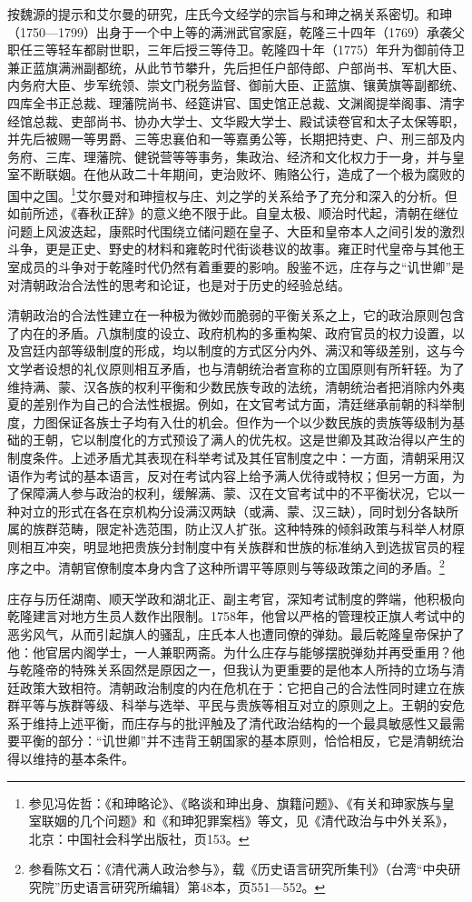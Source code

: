 \documentclass[a4paper, 12pt, openright]{ctexbook}
\begin{document}
按魏源的提示和艾尔曼的研究，庄氏今文经学的宗旨与和珅之祸关系密切。和珅（1750—1799）出身于一个中上等的满洲武官家庭，乾隆三十四年（1769）承袭父职任三等轻车都尉世职，三年后授三等侍卫。乾隆四十年（1775）年升为御前侍卫兼正蓝旗满洲副都统，从此节节攀升，先后担任户部侍郎、户部尚书、军机大臣、内务府大臣、步军统领、崇文门税务监督、御前大臣、正蓝旗、镶黄旗等副都统、四库全书正总裁、理藩院尚书、经筵讲官、国史馆正总裁、文渊阁提举阁事、清字经馆总裁、吏部尚书、协办大学士、文华殿大学士、殿试读卷官和太子太保等职，并先后被赐一等男爵、三等忠襄伯和一等嘉勇公等，长期把持吏、户、刑三部及内务府、三库、理藩院、健锐营等等事务，集政治、经济和文化权力于一身，并与皇室不断联姻。在他从政二十年期间，吏治败坏、贿赂公行，造成了一个极为腐败的国中之国。\footnote{参见冯佐哲：《和珅略论》、《略谈和珅出身、旗籍问题》、《有关和珅家族与皇室联姻的几个问题》和《和珅犯罪案档》等文，见《清代政治与中外关系》，北京：中国社会科学出版社，页153。}艾尔曼对和珅擅权与庄、刘之学的关系给予了充分和深入的分析。但如前所述，《春秋正辞》的意义绝不限于此。自皇太极、顺治时代起，清朝在继位问题上风波迭起，康熙时代围绕立储问题在皇子、大臣和皇帝本人之间引发的激烈斗争，更是正史、野史的材料和雍乾时代街谈巷议的故事。雍正时代皇帝与其他王室成员的斗争对于乾隆时代仍然有着重要的影响。殷鉴不远，庄存与之“讥世卿”是对清朝政治合法性的思考和论证，也是对于历史的经验总结。

清朝政治的合法性建立在一种极为微妙而脆弱的平衡关系之上，它的政治原则包含了内在的矛盾。八旗制度的设立、政府机构的多重构架、政府官员的权力设置，以及宫廷内部等级制度的形成，均以制度的方式区分内外、满汉和等级差别，这与今文学者设想的礼仪原则相互矛盾，也与清朝统治者宣称的立国原则有所轩轾。为了维持满、蒙、汉各族的权利平衡和少数民族专政的法统，清朝统治者把消除内外夷夏的差别作为自己的合法性根据。例如，在文官考试方面，清廷继承前朝的科举制度，力图保证各族士子均有入仕的机会。但作为一个以少数民族的贵族等级制为基础的王朝，它以制度化的方式预设了满人的优先权。这是世卿及其政治得以产生的制度条件。上述矛盾尤其表现在科举考试及其任官制度之中：一方面，清朝采用汉语作为考试的基本语言，反对在考试内容上给予满人优待或特权；但另一方面，为了保障满人参与政治的权利，缓解满、蒙、汉在文官考试中的不平衡状况，它以一种对立的形式在各在京机构分设满汉两缺（或满、蒙、汉三缺），同时划分各缺所属的族群范畴，限定补选范围，防止汉人扩张。这种特殊的倾斜政策与科举人材原则相互冲突，明显地把贵族分封制度中有关族群和世族的标准纳入到选拔官员的程序之中。清朝官僚制度本身内含了这种所谓平等原则与等级政策之间的矛盾。\footnote{参看陈文石：《清代满人政治参与》，载《历史语言研究所集刊》（台湾“中央研究院”历史语言研究所编辑）第48本，页551—552。}

庄存与历任湖南、顺天学政和湖北正、副主考官，深知考试制度的弊端，他积极向乾隆建言对地方生员人数作出限制。1758年，他曾以严格的管理校正旗人考试中的恶劣风气，从而引起旗人的骚乱，庄氏本人也遭同僚的弹劾。最后乾隆皇帝保护了他：他官居内阁学士，一人兼职两斋。为什么庄存与能够摆脱弹劾并再受重用？他与乾隆帝的特殊关系固然是原因之一，但我认为更重要的是他本人所持的立场与清廷政策大致相符。清朝政治制度的内在危机在于：它把自己的合法性同时建立在族群平等与族群等级、科举与选举、平民与贵族等相互对立的原则之上。王朝的安危系于维持上述平衡，而庄存与的批评触及了清代政治结构的一个最具敏感性又最需要平衡的部分：“讥世卿”并不违背王朝国家的基本原则，恰恰相反，它是清朝统治得以维持的基本条件。
\end{document}
